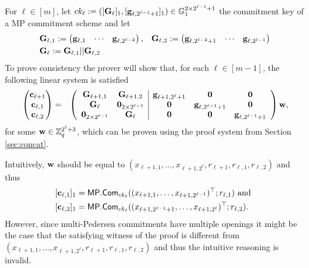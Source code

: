 For \(\ell\in[m]\), let \(ck_\ell:=([\mathbf{{G}}_\ell]_1,\allowbreak[\mathbf{g}_{\ell,2^{\ell-1}+1}]_1)\in\mathbb{G}_1^{2\times{2^{\ell-1}+1}}\) the commitment key of a MP commitment scheme and let
\begin{align*}
&\mathbf{{G}}_{\ell,1}:=
\begin{pmatrix}
    \mathbf{g}_{\ell,1}&\cdots&\mathbf{g}_{\ell,2^{\ell-2}}
\end{pmatrix},
&\mathbf{{G}}_{\ell,2}:=
\begin{pmatrix}
    \mathbf{g}_{\ell,2^{\ell-2}+1}&\cdots&\mathbf{g}_{\ell,2^{\ell-1}}
\end{pmatrix}\\
&\mathbf{{G}}_\ell:=\mathbf{{G}}_{\ell,1}||\mathbf{{G}}_{\ell,2}
\end{align*}
To prove consistency the prover will show that, for each $\ell\in [m-1]$, the following linear system is satisfied
{\begin{align}
&\begin{pmatrix}
\mathbf{c}_{\ell+1}\\
\mathbf{c}_{\ell,1}\\
\mathbf{c}_{\ell,2}
\end{pmatrix}
=
&\left(\begin{array}{cc|ccc}
\mathbf{{G}}_{\ell+1,1}           & \mathbf{{G}}_{\ell+1,2}            & \mathbf{g}_{\ell+1,2^\ell+1} & \mathbf{0}                     & \mathbf{0}\\
\mathbf{{G}}_{\ell}               & \mathbf{{0}}_{2\times2^{\ell-1}}   & \mathbf{0}                   & \mathbf{g}_{\ell,2^{\ell-1}+1} & \mathbf{0} \\
\mathbf{{0}}_{2\times 2^{\ell-1}} & \mathbf{{G}}_{\ell}                & \mathbf{0}                   & \mathbf{0}                     & \mathbf{g}_{\ell,2^{\ell-1}+1}
\end{array}\right)
\mathbf{w},\label{eq-log-split}
\end{align}}%
for some \(\mathbf{w}\in\mathbb{Z}_q^{2^\ell+3}\), which can be proven using the proof system from Section \ref{sec:concat}.

Intuitively, \(\mathbf{w}\) should be equal to \((x_{\ell+1,1},\ldots,x_{\ell+1,2^{\ell}},\allowbreak r_{\ell+1},r_{\ell,1},r_{\ell,2})\) and thus 
\begin{align*}
&[\mathbf{c}_{\ell,1}]_1=\mathsf{MP}.\mathsf{Com}_{ck_\ell}(\allowbreak(x_{\ell+1,1},\ldots,x_{\ell+1,2^{\ell-1}})^\top;r_{\ell,1})\text{ and }\\
&[\mathbf{c}_{\ell,2}]_1=\mathsf{MP}.\mathsf{Com}_{ck_\ell}((x_{\ell+1,2^{\ell-1}+1},\ldots, x_{\ell+1,2^{\ell}})^\top;r_{\ell,2}).
\end{align*}
However, since multi-Pedersen commitments have multiple openings it might be the case that the satisfying witness of the proof is different from \((x_{\ell+1,1},\ldots,\allowbreak x_{\ell+1,2^\ell},r_{\ell+1},r_{\ell,1},r_{\ell,2})\) and thus the intuitive reasoning is invalid.

